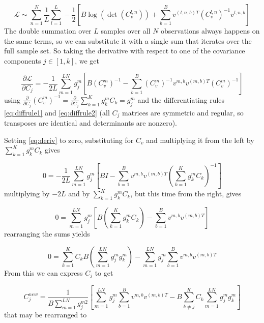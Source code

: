 \documentclass{paper}
\begin{document}
\begin{equation}
\mathcal{L} \sim \sum_{n=1}^N \frac{1}{L} \sum_{l=1}^L -\frac{1}{2} \left[B \log \left( \det \left( C_v^{l,n} \right) \right) + \sum_{b=1}^B v^{(l,n,b)T}  \left( C_v^{l,n} \right)^{-1} v^{l,n,b}\right]
\end{equation}
%
The double summation over $L$ samples over all $N$ observations always happens on the same terms, so we can substitute it with a single sum that iterates over the full sample set. So taking the derivative with respect to one of the covariance components $j \in \left[ 1,k \right]$, we get 

\begin{equation}\label{eq:deriv}
\frac{\partial \mathcal{L}}{\partial C_j} = -\frac{1}{2L} \sum_{m=1}^{LN} g_j^m \left[ B \left( C_v^m \right)^{-1} - \sum_{b=1}^B \left( C_v^m \right)^{-1} v^{m,b} v^{(m,b)T} \left( C_v^m \right)^{-1} \right]
\end{equation}
%
using $\frac{\partial}{\partial C_j} (C_v^m)^{-1} = \frac{\partial}{\partial C_j} \sum_{k=1}^K g_k^m C_k = g_j^m$ and the differentiating rules \ref{eq:diffrule1} and \ref{eq:diffrule2} (all $C_j$ matrices are symmetric and regular, so transposes are identical and determinants are nonzero).

Setting \ref{eq:deriv} to zero, substituting for $C_v$ and multiplying it from the left by $\sum_{k=1}^K g_k^m C_k$ gives

\begin{equation}\label{eq:zero}
0 =  -\frac{1}{2L} \sum_{m=1}^{LN}  g_j^m \left[ BI - \sum_{b=1}^B v^{m,b} v^{(m,b)T} \left( \sum_{k=1}^K g_k^m C_k \right)^{-1} \right]
\end{equation}
%
multiplying by $-2L$ and by $\sum_{k=1}^K g_k^m C_k$, but this time from the right, gives

\begin{equation}
0 = \sum_{m=1}^{LN} g_j^m \left[ B \left( \sum_{k=1}^K g_k^m C_k \right) - \sum_{b=1}^B v^{m,b} v^{(m,b)T} \right]
\end{equation}
%
rearranging the sums yields

\begin{equation}
0 =  \sum_{k=1}^K C_k B \left( \sum_{m=1}^{LN} g_j^m g_k^m \right)  - \sum_{m=1}^{LN} g_j^m \sum_{b=1}^B v^{m,b} v^{(m,b)T}
\end{equation}
%
From this we can express $C_j$ to get

\begin{equation}
C_j^{new} = \frac{1}{B \sum_{m=1}^{LN} g_j^{m2}} \left[ \sum_{m=1}^{LN} g_j^m \sum_{b=1}^B v^{m,b} v^{(m,b)T} - B \sum_{k \neq j}^K C_k \sum_{m=1}^{LN} g_j^m g_k^m \right]
\end{equation}
%
that may be rearranged to
\end{document}
